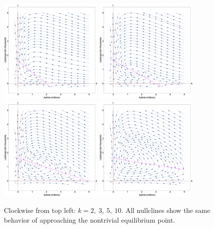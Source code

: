 \documentclass[10pt]{article}
\begin{document}
\begin{figure}[h]
	\centering
	\includegraphics[width=0.45\textwidth]{log_model_nullclines_k2.png}
	\includegraphics[width=0.45\textwidth]{log_model_nullclines_k3.png} \\ [1ex]
	\includegraphics[width=0.45\textwidth]{log_model_nullclines_k5.png}
	\includegraphics[width=0.45\textwidth]{log_model_nullclines_k10.png}
	\caption{Clockwise from top left: \( k = 2, \ 3, \ 5, \ 10 \). All nullclines show the same behavior of approaching the nontrivial equilibrium point.}
	\label{fig:logmodelnullcline}
\end{figure}
\end{document}
